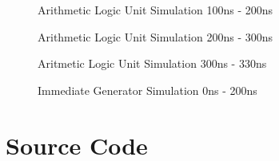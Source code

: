 \documentclass[
    a4paper, %
	12pt, %
    ]{CSSullivanBusinessReport}
\begin{document}
\begin{fullwidth}
\begin{figure}[H]
    \centering
    \captionsetup{style=widetable}
    \caption{Arithmetic Logic Unit Simulation 100ns - 200ns}
    \label{fig:ALUSim1}
\end{figure}

\begin{figure}[H]
    \centering
    \captionsetup{style=widetable}
    \caption{Arithmetic Logic Unit Simulation 200ns - 300ns}
    \label{fig:ALUSim2}
\end{figure}

\begin{figure}[H]
    \centering
    \captionsetup{style=widetable}
    \caption{Aritmetic Logic Unit Simulation 300ns - 330ns}
    \label{fig:ALUSim3}
\end{figure}

\begin{figure}[H]
    \centering
    \captionsetup{style=widetable}
    \caption{Immediate Generator Simulation 0ns - 200ns}
    \label{fig:ImmdGenSim0}
\end{figure}

\newpage
\section{Source Code}
\captionsetup{style=widetable}

\end{fullwidth}
\end{document}
